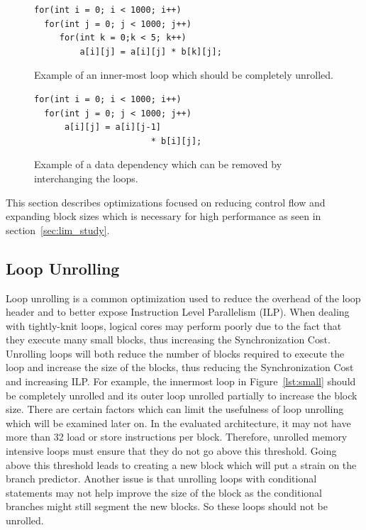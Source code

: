 \begin{figure}[t]
\lstset{language=C,numbersep=4pt,basicstyle=\small}
\begin{lstlisting}
for(int i = 0; i < 1000; i++)
  for(int j = 0; j < 1000; j++)
     for(int k = 0;k < 5; k++)
         a[i][j] = a[i][j] * b[k][j];
\end{lstlisting}
\vspace*{-5mm}
\caption{Example of an inner-most loop which should be completely unrolled.}
\label{lst:small}
\lstset{language=C,numbersep=4pt,basicstyle=\small}
\begin{lstlisting}
for(int i = 0; i < 1000; i++)
  for(int j = 0; j < 1000; j++)
      a[i][j] = a[i][j-1] 
                       * b[i][j];
\end{lstlisting}
\vspace*{-5mm}
\caption{Example of a data dependency which can be removed by interchanging the loops.}
\label{lst:dep}
\vspace{9mm}
\end{figure}

This section describes optimizations focused on reducing control flow and expanding block sizes which is necessary for high performance as seen in section~\ref{sec:lim_study}.

\subsection{Loop Unrolling}
Loop unrolling is a common optimization used to reduce the overhead of the loop header and to better expose Instruction Level Parallelism (ILP).
When dealing with tightly-knit loops, logical cores may perform poorly due to the fact that they execute many small blocks, thus increasing the Synchronization Cost.
Unrolling loops will both reduce the number of blocks required to execute the loop and increase the size of the blocks, thus reducing the Synchronization Cost and increasing ILP.
For example, the innermost loop in Figure~\ref{lst:small} should be completely unrolled and its outer loop unrolled partially to increase the block size.
There are certain factors which can limit the usefulness of loop unrolling which will be examined later on.
In the evaluated architecture, it may not have more than 32 load or store instructions per block.
Therefore, unrolled memory intensive loops must ensure that they do not go above this threshold.
Going above this threshold leads to creating a new block which will put a strain on the branch predictor.
Another issue is that unrolling loops with conditional statements may not help improve the size of the block as the conditional branches might still segment the new blocks.
So these loops should not be unrolled.



